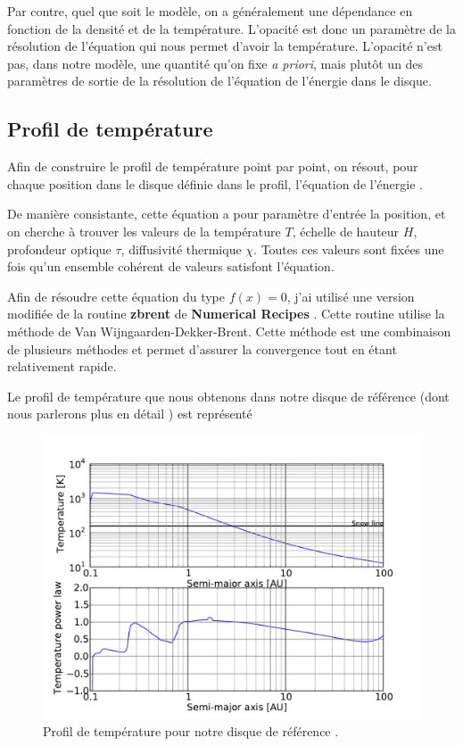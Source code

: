 Par contre, quel que soit le modèle, on a généralement une dépendance en fonction de la densité et de la température. L'opacité est donc un paramètre de la résolution de l'équation qui nous permet d'avoir la température. L'opacité n'est pas, dans notre modèle, une quantité qu'on fixe \emph{a priori}, mais plutôt un des paramètres de sortie de la résolution de l'équation de l'énergie dans le disque.

\subsection{Profil de température}
Afin de construire le profil de température point par point, on résout, pour chaque position dans le disque définie dans le profil, l'équation de l'énergie . 

De manière consistante, cette équation a pour paramètre d'entrée la position, et on cherche à trouver les valeurs de la température $T$, échelle de hauteur $H$, profondeur optique $\tau$, diffusivité thermique $\chi$. Toutes ces valeurs sont fixées une fois qu'un ensemble cohérent de valeurs satisfont l'équation.

Afin de résoudre cette équation du type $f(x)=0$, j'ai utilisé une version modifiée de la routine \textbf{zbrent} de \textbf{Numerical Recipes} \citep{press1992numerical}. Cette routine utilise la méthode de Van Wijngaarden-Dekker-Brent. Cette méthode est une combinaison de plusieurs méthodes et permet d'assurer la convergence tout en étant relativement rapide.

Le profil de température que nous obtenons dans notre disque de référence (dont nous parlerons plus en détail ) est représenté 

\begin{figure}[htbp]
\centering
\includegraphics[width=0.75\linewidth]{figure/fiducial_temperature_profile.pdf}
\caption{Profil de température pour notre disque de référence \protect{}.}\label{fig:fiducial_temperature}
\end{figure}

